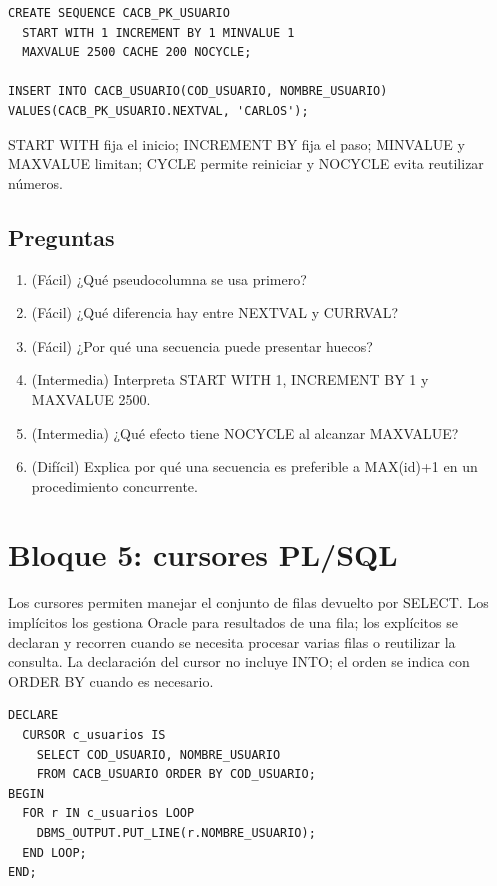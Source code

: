 \documentclass[11pt,a4paper]{article}
\newif\ifmostrarSoluciones
\begin{document}
\begin{lstlisting}
CREATE SEQUENCE CACB_PK_USUARIO
  START WITH 1 INCREMENT BY 1 MINVALUE 1
  MAXVALUE 2500 CACHE 200 NOCYCLE;

INSERT INTO CACB_USUARIO(COD_USUARIO, NOMBRE_USUARIO)
VALUES(CACB_PK_USUARIO.NEXTVAL, 'CARLOS');
\end{lstlisting}

\begin{clave}START WITH fija el inicio; INCREMENT BY fija el paso; MINVALUE y MAXVALUE limitan; CYCLE permite reiniciar y NOCYCLE evita reutilizar números.\end{clave}
\subsection{Preguntas}
\begin{enumerate}[leftmargin=*]
\item (Fácil) ¿Qué pseudocolumna se usa primero?
\item (Fácil) ¿Qué diferencia hay entre NEXTVAL y CURRVAL?
\item (Fácil) ¿Por qué una secuencia puede presentar huecos?
\item (Intermedia) Interpreta START WITH 1, INCREMENT BY 1 y MAXVALUE 2500.
\item (Intermedia) ¿Qué efecto tiene NOCYCLE al alcanzar MAXVALUE?
\item (Difícil) Explica por qué una secuencia es preferible a MAX(id)+1 en un procedimiento concurrente.
\end{enumerate}
\ifmostrarSoluciones\begin{clave}\textbf{Pauta breve:} NEXTVAL inicializa e incrementa; CURRVAL lee el actual. Los huecos aparecen por consumos concurrentes o transacciones revertidas. NOCYCLE detiene la generación al límite. La secuencia evita colisiones entre sesiones.\end{clave}\fi

\section{Bloque 5: cursores PL/SQL}
Los cursores permiten manejar el conjunto de filas devuelto por SELECT. Los implícitos los gestiona
Oracle para resultados de una fila; los explícitos se declaran y recorren cuando se necesita procesar
varias filas o reutilizar la consulta. La declaración del cursor no incluye INTO; el orden se indica
con ORDER BY cuando es necesario.

\begin{lstlisting}
DECLARE
  CURSOR c_usuarios IS
    SELECT COD_USUARIO, NOMBRE_USUARIO
    FROM CACB_USUARIO ORDER BY COD_USUARIO;
BEGIN
  FOR r IN c_usuarios LOOP
    DBMS_OUTPUT.PUT_LINE(r.NOMBRE_USUARIO);
  END LOOP;
END;
\end{lstlisting}
\end{document}
